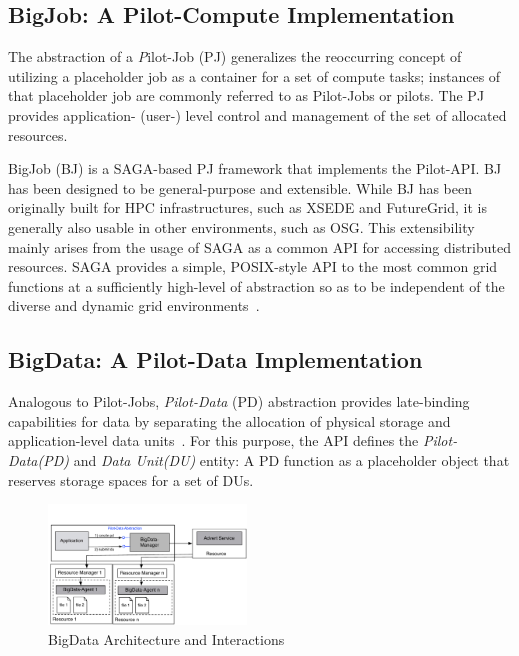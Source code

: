\documentclass{acm_proc_article-sp}
\newcommand{\upp}{\vspace*{-0.5em}}
\newcommand{\pilotjob}{Pilot-Job\xspace}
\newcommand{\pilotjobs}{Pilot-Jobs\xspace}
\newcommand{\pilotcompute}{Pilot-Compute\xspace}
\newcommand{\dataunit}{Data Unit\xspace}
\newcommand{\dus}{DUs\xspace}
\newcommand{\pilotdata}{Pilot-Data\xspace}
\newcommand{\pd}{PD\xspace}
\begin{document}
 
\subsection{BigJob: A \pilotcompute Implementation}

The abstraction of a {\emph \pilotjob} (PJ) generalizes the
reoccurring concept of utilizing a placeholder job as a container for
a set of compute tasks; instances of that placeholder job are commonly
referred to as Pilot-Jobs or pilots. The PJ provides application-
(user-) level control and management of the set of allocated resources.

BigJob (BJ) is a SAGA-based PJ framework that implements the Pilot-API. 
BJ has been designed to be general-purpose and extensible.  While BJ 
has been originally built for HPC infrastructures, such as XSEDE and 
FutureGrid, it is generally also usable in other environments, such 
as OSG.  This extensibility mainly arises
from the usage of SAGA as a common API for accessing distributed
resources.  SAGA provides a simple, POSIX-style API to the most common
grid functions at a sufficiently high-level of abstraction so as to be
independent of the diverse and dynamic grid environments~\cite{pstar-2012}.

\subsection{BigData: A \pilotdata Implementation}

Analogous to \pilotjobs, {\it Pilot-Data} (PD) abstraction provides
late-binding capabilities for data by separating the allocation of
physical storage and application-level data units~\cite{pstar-2012}.
For this purpose, the API defines the {\it \pilotdata (PD)} and 
{\it \dataunit (DU)} entity: A \pd function as a 
placeholder object that reserves storage spaces for a set of \dus.

\begin{figure}[htbp]
	\centering
		\includegraphics[width=0.47\textwidth]{figures/bigdata.pdf}
	\caption{BigData Architecture and Interactions\upp}
	\label{fig:figures_bigdata}
\end{figure}
\end{document}
